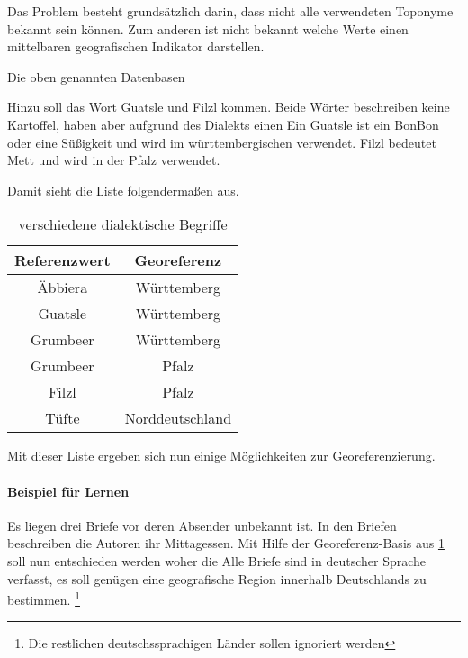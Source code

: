 			Das Problem besteht grundsätzlich darin, dass nicht alle verwendeten Toponyme bekannt sein können. 
			Zum anderen ist nicht bekannt welche Werte einen mittelbaren geografischen Indikator darstellen.




			Die oben genannten Datenbasen  

				Hinzu soll das Wort Guatsle und Filzl kommen.
				Beide Wörter beschreiben keine Kartoffel, haben aber aufgrund des Dialekts einen 
				Ein Guatsle ist ein BonBon oder eine Süßigkeit und wird im württembergischen verwendet.
				Filzl bedeutet Mett und wird in der Pfalz verwendet.

				Damit sieht die Liste folgendermaßen aus.

				\begin{table}[htpb]
					\caption{verschiedene dialektische Begriffe} 
					\centering
					\begin{tabular}{|c|c|}
						\hline
						Referenzwert & Georeferenz \\
						\hline\hline
						Äbbiera & Württemberg \\
						\hline
						Guatsle & Württemberg \\
						\hline
						Grumbeer & Württemberg \\
						\hline
						Grumbeer & Pfalz \\
						\hline
						Filzl & Pfalz \\
						\hline
						Tüfte & Norddeutschland \\
						\hline
					\end{tabular}
					\label{tab:dialektZwei} 
				\end{table} 

				Mit dieser Liste ergeben sich nun einige Möglichkeiten zur Georeferenzierung.

			

			\paragraph{Beispiel für Lernen} 

				Es liegen drei Briefe vor deren Absender unbekannt ist.
				In den Briefen beschreiben die Autoren ihr Mittagessen. 
				Mit Hilfe der Georeferenz-Basis aus \ref{tab:dialektZwei} soll nun entschieden werden woher die 
				Alle Briefe sind in deutscher Sprache verfasst, es soll genügen eine geografische Region innerhalb Deutschlands zu bestimmen. \footnote{Die restlichen deutschssprachigen Länder sollen ignoriert werden}  

